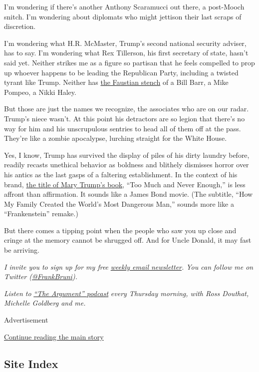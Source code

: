 I'm wondering if there's another Anthony Scaramucci out there, a
post-Mooch snitch. I'm wondering about diplomats who might jettison
their last scraps of discretion.

I'm wondering what H.R. McMaster, Trump's second national security
adviser, has to say. I'm wondering what Rex Tillerson, his first
secretary of state, hasn't said yet. Neither strikes me as a figure so
partisan that he feels compelled to prop up whoever happens to be
leading the Republican Party, including a twisted tyrant like Trump.
Neither has
\href{https://www.nytimes.com/2019/10/05/opinion/sunday/pompeo-trump.html}{the
Faustian stench} of a Bill Barr, a Mike Pompeo, a Nikki Haley.

But those are just the names we recognize, the associates who are on our
radar. Trump's niece wasn't. At this point his detractors are so legion
that there's no way for him and his unscrupulous sentries to head all of
them off at the pass. They're like a zombie apocalypse, lurching
straight for the White House.

Yes, I know, Trump has survived the display of piles of his dirty
laundry before, readily recasts unethical behavior as boldness and
blithely dismisses horror over his antics as the last gasps of a
faltering establishment. In the context of his brand,
\href{https://www.nytimes.com/2020/06/15/books/mary-trump-book.html}{the
title of Mary Trump's book}, ``Too Much and Never Enough,'' is less
affront than affirmation. It sounds like a James Bond movie. (The
subtitle, ``How My Family Created the World's Most Dangerous Man,''
sounds more like a ``Frankenstein'' remake.)

But there comes a tipping point when the people who saw you up close and
cringe at the memory cannot be shrugged off. And for Uncle Donald, it
may fast be arriving.

\emph{I invite you to sign up for my free}
\href{https://www.nytimes.com/newsletters/frank-bruni}{\emph{weekly
email newsletter}}\emph{. You can follow me on Twitter
(}\href{https://twitter.com/FrankBruni}{\emph{@FrankBruni}}\emph{).}

\emph{Listen to}
\href{https://www.nytimes.com/column/the-argument}{\emph{``The
Argument'' podcast}} \emph{every Thursday morning, with Ross Douthat,
Michelle Goldberg and me.}

Advertisement

\protect\hyperlink{after-bottom}{Continue reading the main story}

\hypertarget{site-index}{%
\subsection{Site Index}\label{site-index}}

